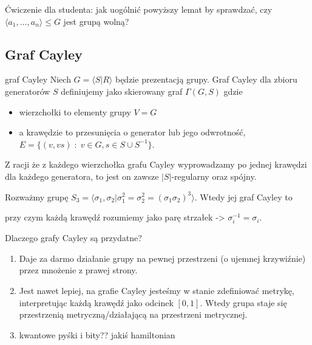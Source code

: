 Ćwiczenie dla studenta: jak uogólnić powyższy lemat by sprawdzać, czy $\langle a_1,...,a_n\rangle\leq G$ jest grupą wolną?

\subsection{Graf Cayley}

\begin{definition}{graf Cayley}{}
  Niech $G=\langle S|R\rangle$ będzie prezentacją grupy. Graf Cayley dla zbioru generatorów $S$ definiujemy jako skierowany graf $\Gamma(G, S)$ gdzie
  \begin{itemize}
    \item wierzchołki to elementy grupy $V=G$
    \item a krawędzie to przesunięcia o generator lub jego odwrotność, $E=\{(v,vs)\;:\;v\in G, s\in S\cup S^{-1}\}$.
  \end{itemize}
\end{definition}

Z racji że z każdego wierzchołka grafu Cayley wyprowadzamy po jednej krawędzi dla każdego generatora, to jest on zawsze $|S|$-regularny oraz spójny.

\begin{example}
  Rozważmy grupę $S_3=\langle \sigma_1, \sigma_2|\sigma_1^2=\sigma_2^2=(\sigma_1\sigma_2)^3\rangle$. Wtedy jej graf Cayley to 
  \begin{center}
  \end{center}
  przy czym każdą krawędź rozumiemy jako parę strzałek -> $\sigma_i^{-1}=\sigma_i$.
\end{example}

Dlaczego grafy Cayley są przydatne?
\begin{enumerate}
  \item Daje za darmo działanie grupy na pewnej przestrzeni (o ujemnej krzywiźnie) przez mnożenie z prawej strony.
  \item Jest nawet lepiej, na grafie Cayley jesteśmy w stanie zdefiniować metrykę, interpretując każdą krawędź jako odcinek $[0,1]$. Wtedy grupa staje się przestrzenią metryczną/działającą na przestrzeni metrycznej.
  \item {\color{red}kwantowe pyśki i bity?? jakiś hamiltonian}
\end{enumerate}

